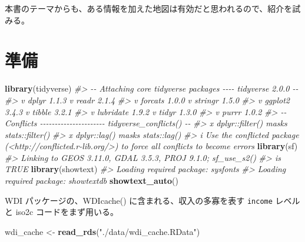 \documentclass[
  xelatex, ja=standard]{bxjsbook}
\newenvironment{Shaded}{\begin{snugshade}}{\end{snugshade}}
\newcommand{\CommentTok}[1]{\textcolor[rgb]{0.56,0.35,0.01}{\textit{#1}}}
\newcommand{\FunctionTok}[1]{\textcolor[rgb]{0.13,0.29,0.53}{\textbf{#1}}}
\newcommand{\NormalTok}[1]{#1}
\newcommand{\OtherTok}[1]{\textcolor[rgb]{0.56,0.35,0.01}{#1}}
\newcommand{\StringTok}[1]{\textcolor[rgb]{0.31,0.60,0.02}{#1}}
\theoremstyle{definition}
\theoremstyle{definition}
\theoremstyle{definition}
\theoremstyle{definition}
\theoremstyle{remark}
\begin{document}
本書のテーマからも、ある情報を加えた地図は有効だと思われるので、紹介を試みる。

\hypertarget{ux6e96ux5099}{%
\section{準備}\label{ux6e96ux5099}}

\begin{Shaded}
\begin{Highlighting}[]
\FunctionTok{library}\NormalTok{(tidyverse)}
\CommentTok{\#\textgreater{} {-}{-} Attaching core tidyverse packages {-}{-}{-}{-} tidyverse 2.0.0 {-}{-}}
\CommentTok{\#\textgreater{} v dplyr     1.1.3     v readr     2.1.4}
\CommentTok{\#\textgreater{} v forcats   1.0.0     v stringr   1.5.0}
\CommentTok{\#\textgreater{} v ggplot2   3.4.3     v tibble    3.2.1}
\CommentTok{\#\textgreater{} v lubridate 1.9.2     v tidyr     1.3.0}
\CommentTok{\#\textgreater{} v purrr     1.0.2     }
\CommentTok{\#\textgreater{} {-}{-} Conflicts {-}{-}{-}{-}{-}{-}{-}{-}{-}{-}{-}{-}{-}{-}{-}{-}{-}{-}{-}{-}{-}{-} tidyverse\_conflicts() {-}{-}}
\CommentTok{\#\textgreater{} x dplyr::filter() masks stats::filter()}
\CommentTok{\#\textgreater{} x dplyr::lag()    masks stats::lag()}
\CommentTok{\#\textgreater{} i Use the conflicted package (\textless{}http://conflicted.r{-}lib.org/\textgreater{}) to force all conflicts to become errors}
\FunctionTok{library}\NormalTok{(sf)}
\CommentTok{\#\textgreater{} Linking to GEOS 3.11.0, GDAL 3.5.3, PROJ 9.1.0; sf\_use\_s2()}
\CommentTok{\#\textgreater{} is TRUE}
\FunctionTok{library}\NormalTok{(showtext)}
\CommentTok{\#\textgreater{} Loading required package: sysfonts}
\CommentTok{\#\textgreater{} Loading required package: showtextdb}
\FunctionTok{showtext\_auto}\NormalTok{()}
\end{Highlighting}
\end{Shaded}

WDI パッケージの、WDIcache() に含まれる、収入の多寡を表す \texttt{income} レベルと iso2c コードをまず用いる。

\begin{Shaded}
\begin{Highlighting}[]
\NormalTok{wdi\_cache }\OtherTok{\textless{}{-}} \FunctionTok{read\_rds}\NormalTok{(}\StringTok{"./data/wdi\_cache.RData"}\NormalTok{)}
\end{Highlighting}
\end{Shaded}
\end{document}
